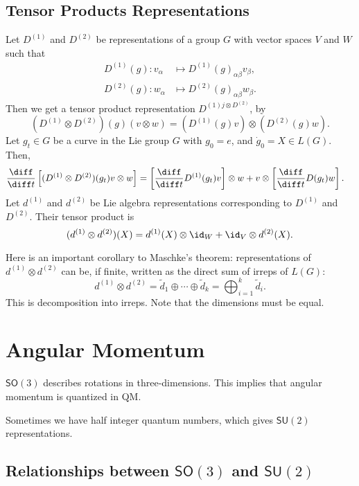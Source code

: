 \documentclass[12pt]{article}
\begin{document}
\subsection{Tensor Products Representations}%
\label{sub:tpr}

Let $D^{(1)}$ and $D^{(2)}$ be representations of a group $G$ with vector spaces $V$ and $W$ such that
\begin{align*}
	D^{(1)}(g) : v_\alpha &\mapsto D^{(1)}(g)_{\alpha\beta} v_\beta, \\
	D^{(2)}(g) : w_\alpha &\mapsto D^{(2)}(g)_{\alpha\beta} w_\beta.
\end{align*}
Then we get a tensor product representation $D^{(1)j \otimes D^{(2)}}$, by
\[
	(D^{(1)} \otimes D^{(2)})(g) (v \otimes w) = (D^{(1)}(g) v ) \otimes (D^{(2)}(g) w).
\]
Let $g_t \in G$ be a curve in the Lie group $G$ with $g_0 = e$, and $\dot g_0 = X \in L(G)$. Then,
\begin{align*}
	\frac{\diff}{\diff t} \left[ (D^{(1)} \otimes D^{(2)})(g_t) v \otimes w \right] &= \left[ \frac{\diff}{\diff t} D^{(1)}(g_t) v \right] \otimes w + v \otimes \left[\frac{\diff}{\diff t} D(g_t) w \right].
\end{align*}
Let $d^{(1)}$ and $d^{(2)}$ be Lie algebra representations corresponding to $D^{(1)}$ and $D^{(2)}$. Their tensor product is
\[
	(d^{(1)} \otimes d^{(2)})(X) = d^{(1)}(X) \otimes \id_W + \id_V \otimes d^{(2)}(X).
\]

Here is an important corollary to Maschke's theorem: representations of $d^{(1)} \otimes d^{(2)}$ can be, if finite, written as the direct sum of irreps of $L(G)$:
\[
d^{(1)} \otimes d^{(2)} = \tilde d_1 \oplus \cdots \oplus \tilde d_k = \bigoplus_{i = 1}^k \tilde d_i.
\]
This is decomposition into irreps. Note that the dimensions must be equal.

\newpage

\section{Angular Momentum}%
\label{sec:am}

$\mathsf{SO}(3)$ describes rotations in three-dimensions. This implies that angular momentum is quantized in QM.

Sometimes we have half integer quantum numbers, which gives $\mathsf{SU}(2)$ representations.

\subsection{Relationships between \texorpdfstring{$\mathsf{SO}(3)$}{SO(3)} and \texorpdfstring{$ \mathsf{SU}(2)$}{SU(2)}}%
\label{sub:rels}
\end{document}

